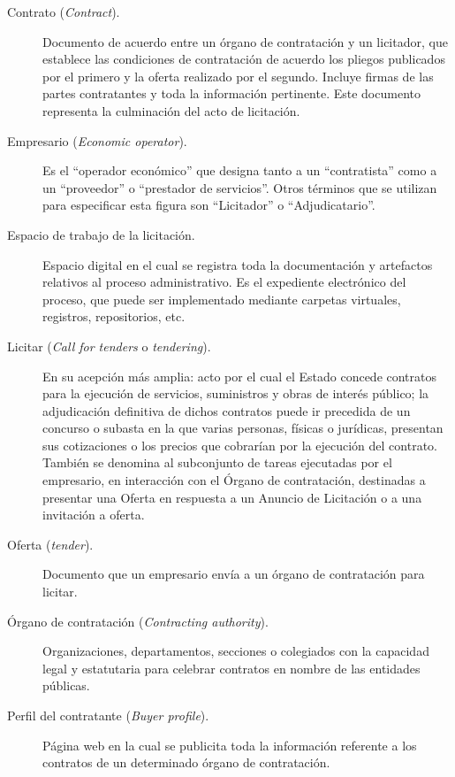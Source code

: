 \begin{description}
\item [Contrato (\textit{Contract}).] Documento de acuerdo entre un órgano de contratación y un licitador, que 
establece las condiciones de contratación de acuerdo los pliegos publicados por el primero
y la oferta realizado por el segundo. Incluye firmas de las partes contratantes y toda la información
pertinente. Este documento representa la culminación del acto de licitación.

\item [Empresario (\textit{Economic operator}).] Es el ``operador económico'' que designa tanto a un ``contratista''
como a un ``proveedor'' o ``prestador de servicios''. Otros términos que se utilizan
para especificar esta figura son ``Licitador'' o ``Adjudicatario''.

\item [Espacio de trabajo de la licitación.] Espacio digital en el cual se registra toda
la documentación y artefactos relativos al proceso administrativo. Es el expediente electrónico
del proceso, que puede ser implementado mediante carpetas virtuales, registros, repositorios, etc.

\item [Licitar (\textit{Call for tenders} o \textit{tendering}).] En su acepción más amplia: acto por el cual el Estado concede contratos para la
ejecución de servicios, suministros y obras de interés público; la adjudicación definitiva de
dichos contratos puede ir precedida de un concurso o subasta en la que varias personas, físicas
o jurídicas, presentan sus cotizaciones o los precios que cobrarían por la ejecución del
contrato. También se denomina al subconjunto de tareas ejecutadas por el empresario,
en interacción con el Órgano de contratación, destinadas a presentar una Oferta en respuesta
a un Anuncio de Licitación o a una invitación a oferta.

\item [Oferta (\textit{tender}).] Documento que un empresario envía a
un órgano de contratación para licitar.

\item [Órgano de contratación (\textit{Contracting authority}).] Organizaciones, departamentos, secciones
o colegiados con la capacidad legal y estatutaria para celebrar
contratos en nombre de las entidades públicas.

\item [Perfil del contratante (\textit{Buyer profile}).] Página web en la cual se publicita toda la información
referente a los contratos de un determinado órgano de contratación.


\end{description}
